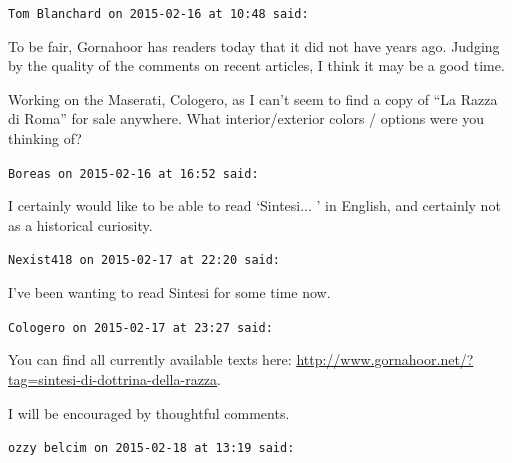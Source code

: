 \begin{footnotesize}
\begin{sffamily}
\hfill

\texttt{Tom Blanchard on 2015-02-16 at 10:48 said:}

To be fair, Gornahoor has readers today that it did not have years ago. Judging by the quality of the comments on recent articles, I think it may be a good time.

Working on the Maserati, Cologero, as I can't seem to find a copy of ``La Razza di Roma'' for sale anywhere. What interior/exterior colors / options were you thinking of?

\hfill

\texttt{Boreas on 2015-02-16 at 16:52 said:}

I certainly would like to be able to read `Sintesi... ' in English, and certainly not as a historical curiosity.

\hfill

\texttt{Nexist418 on 2015-02-17 at 22:20 said:}

I've been wanting to read Sintesi for some time now.

\hfill

\texttt{Cologero on 2015-02-17 at 23:27 said:}

You can find all currently available texts here: \url{http://www.gornahoor.net/?tag=sintesi-di-dottrina-della-razza}.

I will be encouraged by thoughtful comments.

\hfill

\texttt{ozzy belcim on 2015-02-18 at 13:19 said:}


\end{sffamily}
\end{footnotesize}
